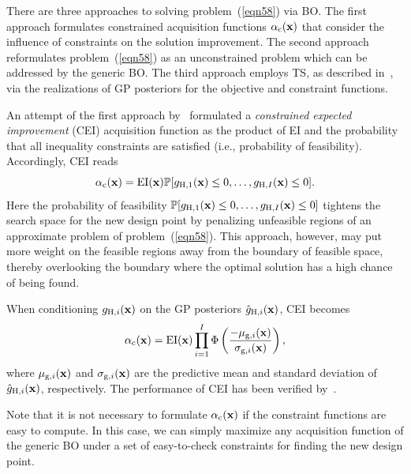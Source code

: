 \documentclass[iicol,sn-basic]{sn-jnl}%
\begin{document}
There are three approaches to solving problem~(\ref{eqn58}) via BO.
The first approach formulates constrained acquisition functions $\alpha_\text{c}({\bf x})$ that consider the influence of constraints on the solution improvement.
The second approach reformulates problem~(\ref{eqn58}) as an unconstrained problem which can be addressed by the generic BO.
The third approach employs TS, as described in~, via the realizations of GP posteriors for the objective and constraint functions.    

An attempt of the first approach by~\cite{Schonlau1998} formulated a \textit{constrained expected improvement} (CEI) acquisition function as the product of EI and the probability that all inequality constraints are satisfied (i.e., probability of feasibility).
Accordingly, CEI reads
\begin{equation}\label{eqn59}
	\alpha_\text{c}({\bf x}) = \text{EI}({\bf x}) \mathbb{P}[g_{\text{H},1}({\bf x}) \leq 0,\dots,g_{\text{H},I}({\bf x}) \leq 0].
\end{equation}
Here the probability of feasibility $\mathbb{P}[g_{\text{H},1}({\bf x}) \leq 0,\dots,g_{\text{H},I}({\bf x}) \leq 0]$ tightens the search space for the new design point by penalizing unfeasible regions of an approximate problem of problem~(\ref{eqn58}).
This approach, however, may put more weight on the feasible regions away from the boundary of feasible space, thereby overlooking the boundary where the optimal solution has a high chance of being found.

When conditioning $g_{\text{H},i}({\bf x})$ on the GP posteriors $\hat{g}_{\text{H},i}({\bf x})$, CEI becomes
\begin{equation}\label{eqn60}
	\alpha_\text{c}({\bf x}) = \text{EI}({\bf x}) \prod_{i=1}^I\Phi\left(\frac{-\mu_{\text{g},i}({\bf x})}{\sigma_{\text{g},i}({\bf x})}\right),
\end{equation}
where $\mu_{\text{g},i}({\bf x})$ and $\sigma_{\text{g},i}({\bf x})$ are the predictive mean and standard deviation of $\hat{g}_{\text{H},i}({\bf x})$, respectively.
The performance of CEI has been verified by~\cite{Gardner2014,Sobester2014,Kontogiannis2020b}.

Note that it is not necessary to formulate $\alpha_\text{c}({\bf x})$ if the constraint functions are easy to compute.
In this case, we can simply maximize any acquisition function of the generic BO under a set of easy-to-check constraints for finding the new design point.
\end{document}
